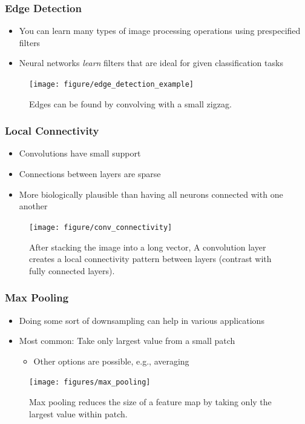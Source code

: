 \documentclass[10pt,mathserif]{beamer}
\begin{document}
\begin{frame}
  \frametitle{Edge Detection}
  \begin{itemize}
    \item You can learn many types of image processing operations using
      prespecified filters
    \item Neural networks \textit{learn} filters that are ideal for given
      classification tasks
  \end{itemize}
  \begin{figure}[ht]
    \centering
    \texttt{[image: figure/edge\_detection\_example]}
    \caption{Edges can be found by convolving with a small
      zigzag. \label{fig:edges_example} }
  \end{figure}
\end{frame}

\begin{frame}
  \frametitle{Local Connectivity}
  \begin{itemize}
  \item Convolutions have small support
  \item Connections between layers are sparse
  \item More biologically plausible than having all neurons connected with one
    another
  \end{itemize}
  \begin{figure}[ht]
    \centering
    \texttt{[image: figure/conv\_connectivity]}
    \caption{After stacking the image into a long vector, A convolution layer
      creates a local connectivity pattern between layers (contrast with fully
      connected layers). \label{fig:conv_connectivity} }
  \end{figure}
\end{frame}

\begin{frame}
  \frametitle{Max Pooling}
  \begin{itemize}
  \item Doing some sort of downsampling can help in various applications
  \item Most common: Take only largest value from a small patch
    \begin{itemize}
    \item Other options are possible, e.g., averaging
    \end{itemize}
  \end{itemize}
  \begin{figure}
    \centering
    \texttt{[image: figures/max\_pooling]}
    \caption{Max pooling reduces the size of a feature map by taking only the
      largest value within patch.
      \label{fig:max_pooling}}
  \end{figure}
\end{frame}
\end{document}
